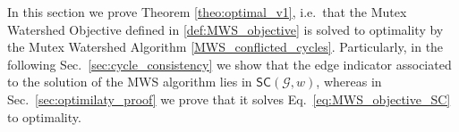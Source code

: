 
In this section we prove Theorem \ref{theo:optimal_v1}, i.e.\ that the Mutex Watershed Objective defined in \ref{def:MWS_objective} is solved to optimality by the Mutex Watershed Algorithm \ref{MWS_conflicted_cycles}. Particularly, in the following Sec.~\ref{sec:cycle_consistency} we show that the edge indicator associated to the solution of the MWS algorithm lies in $\mathsf{SC}(\mathcal{G},w)$, whereas in Sec.~\ref{sec:optimilaty_proof} we prove that it solves Eq.~\ref{eq:MWS_objective_SC} to optimality.







